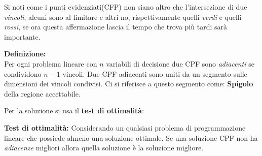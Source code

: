 \documentclass{article}
\begin{document}
Si noti come i punti evidenziati(CFP) non siano altro che l'intersezione di due \textit{vincoli}, alcuni sono al limitare e altri no, rispettivamente quelli \textit{verdi} e quelli \textit{rossi}, se ora questa affermazione lascia il tempo che trova più tardi sarà importante.

\begin{tcolorbox}
  \textbf{Definizione:} \\
  Per ogni problema lineare con $n$ variabili di decisione due CPF sono \textit{adiacenti} se condividono $n-1$ vincoli. Due CPF adiacenti sono uniti da un segmento sulle dimensioni dei vincoli condivisi. Ci si riferisce a questo segmento come: \textbf{Spigolo} della regione accettabile.
\end{tcolorbox}

Per la soluzione si usa il \textbf{test di ottimalità}:

\begin{tcolorbox}
  \textbf{Test di ottimalità:}
  Considerando un qualsiasi problema di programmazione lineare che possiede almeno una soluzione ottimale. Se una soluzione CPF non ha \textit{adiacenze} migliori allora quella soluzione è la soluzione migliore.
\end{tcolorbox}
\end{document}
